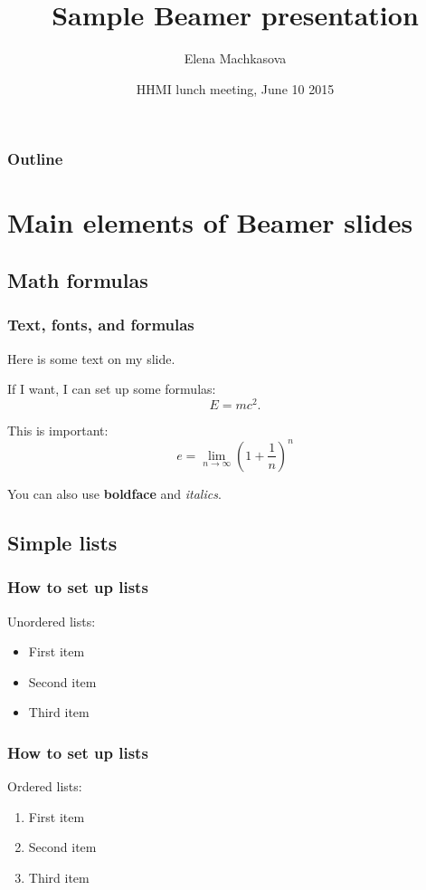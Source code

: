\documentclass{beamer}
\begin{document}
\title{Sample Beamer presentation}
\author{Elena Machkasova}
\date[]  
{HHMI lunch meeting, June 10 2015}

\begin{frame}
  \titlepage
\end{frame}

\begin{frame}

  \frametitle{Outline}
\tableofcontents
\end{frame}

\section{Main elements of Beamer slides}

\subsection{Math formulas}

\begin{frame}
  \frametitle{Text, fonts, and formulas}
Here is some text on my slide. 

If I want, I can set up some formulas:
$$
E = mc^2.
$$

This is \alert{important}:
\[
e = \lim_{n \to \infty} {\left( 1 + \frac{1}{n} \right)}^n
\]

You can also use \textbf{boldface} and \textit{italics}. 
\end{frame}

\subsection{Simple lists}

\begin{frame}
  \frametitle{How to set up lists}
Unordered lists:
\begin{itemize}
\item First item 
\item Second item
\item Third item
\end{itemize}
\end{frame}

\begin{frame}
  \frametitle{How to set up lists}
Ordered lists:
\begin{enumerate}
\item First item 
\item Second item
\item Third item
\end{enumerate}
\end{frame}
\end{document}
